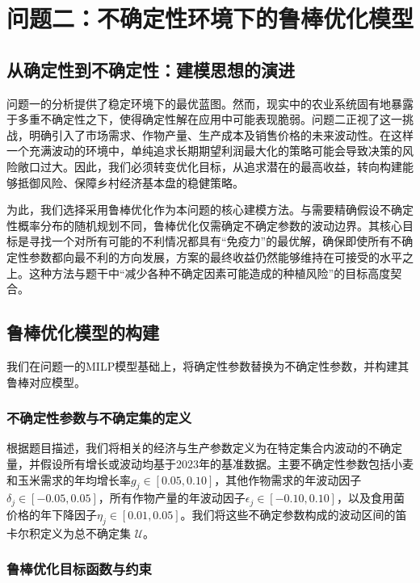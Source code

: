 
\section{问题二：不确定性环境下的鲁棒优化模型}

\subsection{从确定性到不确定性：建模思想的演进}

问题一的分析提供了稳定环境下的最优蓝图。然而，现实中的农业系统固有地暴露于多重不确定性之下，使得确定性解在应用中可能表现脆弱。问题二正视了这一挑战，明确引入了市场需求、作物产量、生产成本及销售价格的未来波动性。在这样一个充满波动的环境中，单纯追求长期期望利润最大化的策略可能会导致决策的风险敞口过大。因此，我们必须转变优化目标，从追求潜在的最高收益，转向构建能够抵御风险、保障乡村经济基本盘的稳健策略。

为此，我们选择采用鲁棒优化作为本问题的核心建模方法。与需要精确假设不确定性概率分布的随机规划不同，鲁棒优化仅需确定不确定参数的波动边界。其核心目标是寻找一个对所有可能的不利情况都具有“免疫力”的最优解，确保即使所有不确定性参数都向最不利的方向发展，方案的最终收益仍然能够维持在可接受的水平之上。这种方法与题干中“减少各种不确定因素可能造成的种植风险”的目标高度契合。

\subsection{鲁棒优化模型的构建}

我们在问题一的MILP模型基础上，将确定性参数替换为不确定性参数，并构建其鲁棒对应模型。

\subsubsection{不确定性参数与不确定集的定义}

根据题目描述，我们将相关的经济与生产参数定义为在特定集合内波动的不确定量，并假设所有增长或波动均基于2023年的基准数据。主要不确定性参数包括小麦和玉米需求的年均增长率$g_j \in [0.05, 0.10]$，其他作物需求的年波动因子$\delta_j \in [-0.05, 0.05]$，所有作物产量的年波动因子$\epsilon_j \in [-0.10, 0.10]$，以及食用菌价格的年下降因子$\eta_j \in [0.01, 0.05]$。我们将这些不确定参数构成的波动区间的笛卡尔积定义为总不确定集 $\mathcal{U}$。

\subsubsection{鲁棒优化目标函数与约束}


